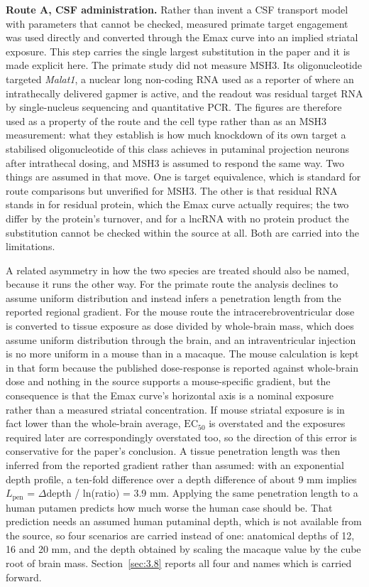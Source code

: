 \documentclass[conference]{IEEEtran}
\begin{document}
\textbf{Route A, CSF administration.} Rather than invent a CSF transport model with parameters that cannot be checked, measured primate target engagement was used directly \cite{frei} and converted through the Emax curve into an implied striatal exposure. This step carries the single largest substitution in the paper and it is made explicit here. The primate study did not measure MSH3. Its oligonucleotide targeted \textit{Malat1}, a nuclear long non-coding RNA used as a reporter of where an intrathecally delivered gapmer is active, and the readout was residual target RNA by single-nucleus sequencing and quantitative PCR. The figures are therefore used as a property of the route and the cell type rather than as an MSH3 measurement: what they establish is how much knockdown of its own target a stabilised oligonucleotide of this class achieves in putaminal projection neurons after intrathecal dosing, and MSH3 is assumed to respond the same way. Two things are assumed in that move. One is target equivalence, which is standard for route comparisons but unverified for MSH3. The other is that residual RNA stands in for residual protein, which the Emax curve actually requires; the two differ by the protein's turnover, and for a lncRNA with no protein product the substitution cannot be checked within the source at all. Both are carried into the limitations.

A related asymmetry in how the two species are treated should also be named, because it runs the other way. For the primate route the analysis declines to assume uniform distribution and instead infers a penetration length from the reported regional gradient. For the mouse route the intracerebroventricular dose is converted to tissue exposure as dose divided by whole-brain mass, which does assume uniform distribution through the brain, and an intraventricular injection is no more uniform in a mouse than in a macaque. The mouse calculation is kept in that form because the published dose-response is reported against whole-brain dose and nothing in the source supports a mouse-specific gradient, but the consequence is that the Emax curve's horizontal axis is a nominal exposure rather than a measured striatal concentration. If mouse striatal exposure is in fact lower than the whole-brain average, $\mathrm{EC}_{50}$ is overstated and the exposures required later are correspondingly overstated too, so the direction of this error is conservative for the paper's conclusion. A tissue penetration length was then inferred from the reported gradient rather than assumed: with an exponential depth profile, a ten-fold difference over a depth difference of about 9 mm implies $L_{\mathrm{pen}}$ = $\Delta$depth / ln(ratio) = 3.9 mm. Applying the same penetration length to a human putamen predicts how much worse the human case should be. That prediction needs an assumed human putaminal depth, which is not available from the source, so four scenarios are carried instead of one: anatomical depths of 12, 16 and 20 mm, and the depth obtained by scaling the macaque value by the cube root of brain mass. Section~\ref{sec:3.8} reports all four and names which is carried forward.
\end{document}
